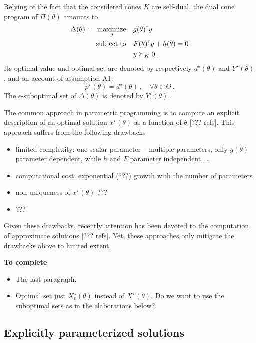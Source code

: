 \documentclass{article}
\renewcommand{\t}{^{\mbox{\tiny \sf T}}}
\DeclareMathOperator*{\maximize}{maximize}
\DeclareMathOperator*{\subj}{subject\;to}
\begin{document}
Relying of the fact that the considered cones $K$ are self-dual, the dual cone program of $\Pi(\theta)$ amounts to
\begin{gather}\label{eq:parametric_dual}
\begin{aligned}
\Delta(\theta): && \maximize_{y} &&& g(\theta)\t y\\
                && \subj         &&& F(\theta)\t y + h(\theta)= 0\\
                &&               &&& y \succeq_K 0  \;.
\end{aligned}
\end{gather}
Its optimal value and optimal set are denoted by respectively $d^\star(\theta)$ and $Y^\star(\theta)$, and on account of assumption A1:
\[ p^\star(\theta) = d^\star(\theta)\,,\quad \forall \theta\in\Theta\,.
\]
The $\epsilon$-suboptimal set of $\Delta(\theta)$ is denoted by $Y^\star_\epsilon(\theta)$.

The common approach in parametric programming is to compute an explicit description of an optimal solution $x^\star(\theta)$ as a function of $\theta$ [??? refs]. This approach suffers from the following drawbacks
\begin{itemize}
\item limited complexity: one scalar parameter -- multiple parameters, only $g(\theta)$ parameter dependent, while $h$ and $F$ parameter independent, \ldots
\item computational cost: exponential (???) growth with the number of parameters
\item non-uniqueness of $x^\star(\theta)$ ???
\item ???
\end{itemize}
Given these drawbacks, recently attention has been devoted to the computation of approximate solutions [??? refs]. Yet, these approaches only mitigate the drawbacks above to limited extent.

\vspace*{12pt}\noindent
\textbf{To complete}
\begin{itemize}
\item The last paragraph.
\item Optimal set just $X^\star_0(\theta)$ instead of $X^\star(\theta)$. Do we want to use the suboptimal sets as in the elaborations below?
\end{itemize}


\subsection{Explicitly parameterized solutions}\label{subsec:parameterized_solution}%
\end{document}
